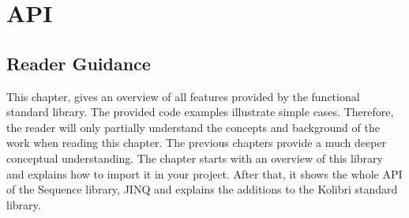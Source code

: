 \chapter{API} %
\label{chap:api}

\section*{Reader Guidance} %
\label{sec:api_reader_guidance}
This chapter, gives an overview of all features provided by the functional
standard library. The provided code examples illustrate simple cases.
Therefore, the reader will only partially understand the concepts and
background of the work when reading this chapter. The previous chapters provide
a much deeper conceptual understanding.
The chapter starts with an overview of this library and explains how to import
it in your project. After that, it shows the whole API of the Sequence library,
JINQ and explains the additions to the Kolibri standard library.







